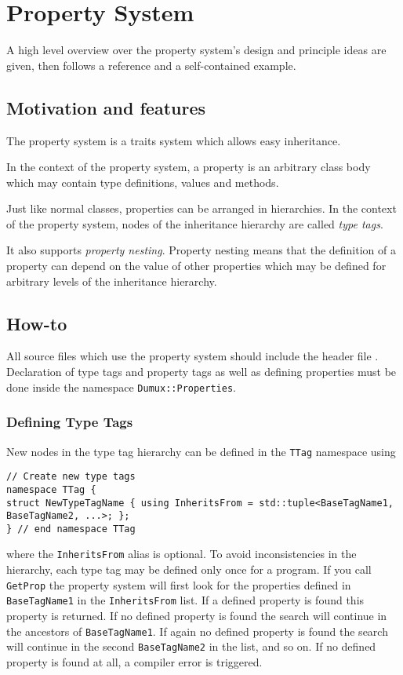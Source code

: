 \section{Property System}
\label{sec:propertysystem}
A high level overview over the property system's design and principle ideas
are given, then follows a reference and a self-contained example.

\subsection{Motivation and features}
The \Dumux property system is a traits system
which allows easy inheritance.

In the context of the \Dumux property system, a property is an arbitrary
class body which may contain type definitions, values and methods.

Just like normal classes, properties can be arranged in hierarchies. In
the context of the \Dumux property system, nodes of the inheritance
hierarchy are called \emph{type tags}.

It also supports \emph{property nesting}. Property nesting means that the definition of
a property can depend on the value of other properties which may be
defined for arbitrary levels of the inheritance hierarchy.

\subsection{How-to}
All source files which use the property system should include
the header file .
Declaration of type tags and
property tags as well as defining properties must be done inside the
namespace \texttt{Dumux::Properties}.

\subsubsection{Defining Type Tags}
New nodes in the type tag hierarchy can be defined in the \texttt{TTag} namespace using
\begin{lstlisting}[style=DumuxCode]
// Create new type tags
namespace TTag {
struct NewTypeTagName { using InheritsFrom = std::tuple<BaseTagName1, BaseTagName2, ...>; };
} // end namespace TTag
\end{lstlisting}
where the \texttt{InheritsFrom} alias is optional. To avoid
inconsistencies in the hierarchy, each type tag may be defined only
once for a program. If you call \texttt{GetProp} the property system will first look for the properties defined in \texttt{BaseTagName1} in the \texttt{InheritsFrom} list.
If a defined property is found this property is returned. If no defined property is found the search will continue in the ancestors of \texttt{BaseTagName1}.
If again no defined property is found the search will continue in the second \texttt{BaseTagName2} in the list, and so on.
If no defined property is found at all, a compiler error is triggered.

